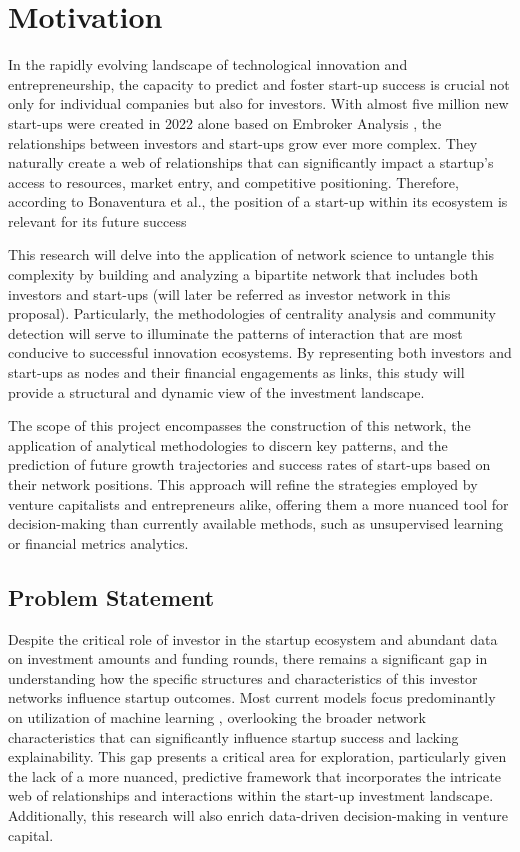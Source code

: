 \documentclass[a4paper,11pt]{article}
\begin{document}
\section{Motivation}
In the rapidly evolving landscape of technological innovation and entrepreneurship, the capacity to predict and foster start-up success is crucial not only for individual companies but also for investors. With almost five million new start-ups were created in 2022 alone based on Embroker Analysis \cite{embroker2024a}, the relationships between investors and start-ups grow ever more complex. They naturally create a web of relationships that can significantly impact a startup’s access to resources, market entry, and competitive positioning. Therefore, according to Bonaventura et al., the position of a start-up within its ecosystem is relevant for its future success \cite{bonaventura2020a}

This research will delve into the application of network science to untangle this complexity by building and analyzing a bipartite network that includes both investors and start-ups (will later be referred as investor network in this proposal). Particularly, the methodologies of centrality analysis and community detection will serve to illuminate the patterns of interaction that are most conducive to successful innovation ecosystems. By representing both investors and start-ups as nodes and their financial engagements as links, this study will provide a structural and dynamic view of the investment landscape.

The scope of this project encompasses the construction of this network, the application of analytical methodologies to discern key patterns, and the prediction of future growth trajectories and success rates of start-ups based on their network positions. This approach will refine the strategies employed by venture capitalists and entrepreneurs alike, offering them a more nuanced tool for decision-making than currently available methods, such as unsupervised learning or financial metrics analytics.

\subsection{Problem Statement}
Despite the critical role of investor in the startup ecosystem and abundant data on investment amounts and funding rounds, there remains a significant gap in understanding how the specific structures and characteristics of this investor networks influence startup outcomes. Most current models focus predominantly on utilization of machine learning \cite{krishna2016a} \cite{carniel2023a} \cite{sharchilev2018a} \cite{yang2020a}, overlooking the broader network characteristics that can significantly influence startup success and lacking explainability. This gap presents a critical area for exploration, particularly given the lack of a more nuanced, predictive framework that incorporates the intricate web of relationships and interactions within the start-up investment landscape. Additionally, this research will also enrich data-driven decision-making in venture capital.
\end{document}

